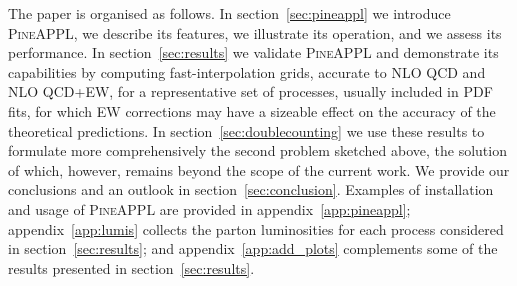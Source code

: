 The paper is organised as follows. In section~\ref{sec:pineappl} we introduce
\textsc{PineAPPL}, we describe its features, we illustrate its operation, and we
assess its performance. In section~\ref{sec:results} we validate
\textsc{PineAPPL} and demonstrate its capabilities by computing fast-interpolation grids, accurate to NLO QCD and NLO QCD+EW, for a representative
set of processes, usually included in PDF fits, for which EW corrections may
have a sizeable effect on the accuracy of the theoretical predictions.
In section~\ref{sec:doublecounting} we use these results to formulate more
comprehensively the second problem sketched above, the solution of which, 
however, remains beyond the scope of the current work. We provide our
conclusions and an outlook in section~\ref{sec:conclusion}. Examples of
installation and usage of \textsc{PineAPPL} are provided in
appendix~\ref{app:pineappl}; appendix~\ref{app:lumis} collects the parton
luminosities for each process considered in section~\ref{sec:results}; and
appendix~\ref{app:add_plots} complements some of the results presented
in section~\ref{sec:results}.

